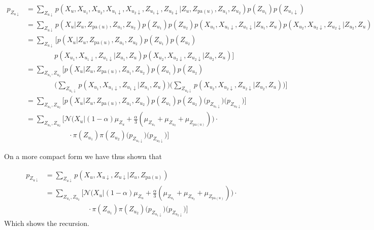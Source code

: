 \begin{align}
  p_{Z_{u \downarrow}} & = \sum_{Z_{u \downarrow}} p(X_u, X_{u_1}, X_{u_2}, X_{u_1 \downarrow}, X_{u_2 \downarrow}, Z_{u_1 \downarrow}, Z_{u_2 \downarrow}|Z_u, Z_{\text{pa}(u)}, Z_{u_1}, Z_{u_2})p(Z_{u_1}) p(Z_{u_1\downarrow}) \nonumber \\
  & = \sum_{Z_{u \downarrow}} p(X_u|Z_u, Z_{\text{pa}(u)}, Z_{u_1}, Z_{u_2}) p(Z_{u_1})p(Z_{u_2})p(X_{u_1}, X_{u_1\downarrow}, Z_{u_1\downarrow}|Z_{u_1}, Z_u) p(X_{u_2}, X_{u_2\downarrow}, Z_{u_2\downarrow}|Z_{u_2}, Z_u) \nonumber\\
  & = \sum_{Z_{u \downarrow}} \bigg[ p(X_u|Z_u, Z_{\text{pa}(u)}, Z_{u_1}, Z_{u_2})p(Z_{u_1})p(Z_{u_2}) \nonumber\\
  & \qquad\qquad p(X_{u_1}, X_{u_1\downarrow}, Z_{u_1\downarrow}|Z_{u_1}, Z_u) p(X_{u_2}, X_{u_2\downarrow}, Z_{u_2\downarrow}|Z_{u_2}, Z_u) \bigg] \nonumber\\
  & = \sum_{Z_{u_1}, Z_{u_2}} \bigg[ p(X_u|Z_u, Z_{\text{pa}(u)}, Z_{u_1}, Z_{u_2})p(Z_{u_1})p(Z_{u_2}) \nonumber\\
  & \qquad\qquad
  \Big( \sum_{Z_{u_1\downarrow}} p(X_{u_1}, X_{u_1\downarrow}, Z_{u_1\downarrow}|Z_{u_1}, Z_u) \Big)
  \Big( \sum_{Z_{u_2\downarrow}} p(X_{u_2}, X_{u_2\downarrow}, Z_{u_2\downarrow}|Z_{u_2}, Z_u)\Big) \bigg] \nonumber\\
  & = \sum_{Z_{u_1}, Z_{u_2}} \bigg[ p(X_u|Z_u, Z_{\text{pa}(u)}, Z_{u_1}, Z_{u_2})p(Z_{u_1})p(Z_{u_2}) \Big(p_{Z_{u_1\downarrow}}\Big) \Big( p_{Z_{u_2\downarrow}}\Big)\bigg] \nonumber \\
  & = \sum_{Z_{u_1}, Z_{u_2}} \bigg[ \mathcal{N}\Big(X_u|(1-\alpha)\mu_{Z_u} +\frac{\alpha}{3}(\mu_{Z_{u_1}}+\mu_{Z_{u_2}}+\mu_{Z_{\text{pa}(u)}}) \Big) \cdot \nonumber\\
  & \qquad\qquad\qquad  \cdot \pi(Z_{u_1}) \pi(Z_{u_2}) \Big(p_{Z_{u_1\downarrow}}\Big) \Big( p_{Z_{u_2\downarrow}}\Big)\bigg]\nonumber
\end{align}

On a more compact form we have thus shown that

\begin{align}
  p_{Z_{u \downarrow}} & = \sum_{Z_{u \downarrow}} p(X_u, X_{u \downarrow}, Z_{u \downarrow}|Z_u, Z_{\text{pa}(u)}) \\
  & = \sum_{Z_{u_1}, Z_{u_2}} \bigg[ \mathcal{N}\Big(X_u|(1-\alpha)\mu_{Z_u} +\frac{\alpha}{3}(\mu_{Z_{u_1}}+\mu_{Z_{u_2}}+\mu_{Z_{\text{pa}(u)}}) \Big) \cdot \\
  & \qquad\qquad\qquad  \cdot \pi(Z_{u_1}) \pi(Z_{u_2}) \Big(p_{Z_{u_1\downarrow}}\Big) \Big( p_{Z_{u_2\downarrow}}\Big)\bigg]
\end{align}
Which shows the recursion.


